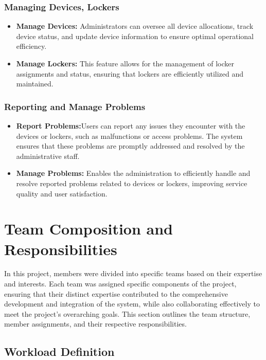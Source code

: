 \subsubsection{Managing Devices, Lockers}
\begin{itemize}
\item \textbf{Manage Devices:} Administrators can oversee all device allocations, track device status, and update device information to ensure optimal operational efficiency.
\item \textbf{Manage Lockers:} This feature allows for the management of locker assignments and status, ensuring that lockers are efficiently utilized and maintained.

\end{itemize}

\subsubsection{Reporting and Manage Problems}
\begin{itemize}
\item \textbf{Report Problems:}Users can report any issues they encounter with the devices or lockers, such as malfunctions or access problems. The system ensures that these problems are promptly addressed and resolved by the administrative staff.
\item \textbf{Manage Problems:} Enables the administration to efficiently handle and resolve reported problems related to devices or lockers, improving service quality and user satisfaction.
\end{itemize}

\section{Team Composition and Responsibilities}
In this project, members were divided into specific teams based on their expertise and interests. Each team was assigned specific components of the project, ensuring that their distinct expertise contributed to the comprehensive development and integration of the system, while also collaborating effectively to meet the project's overarching goals. This section outlines the team structure, member assignments, and their respective responsibilities. 

\subsection{Workload Definition}

